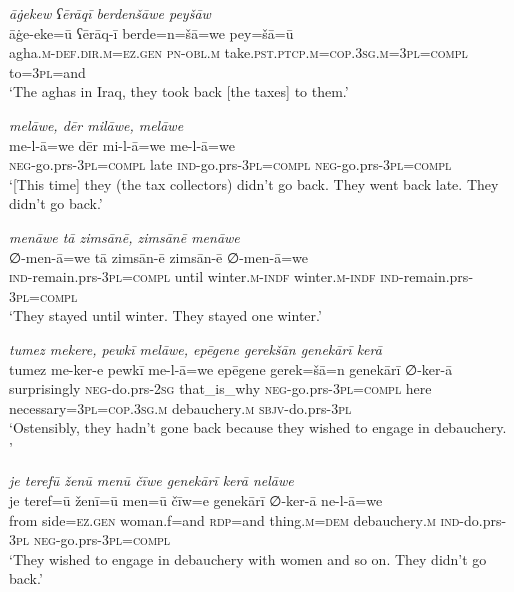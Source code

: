 \ea \label{BP.28}
\textit{āġekew ʕērāqī berdenšāwe peyšāw} \\ 
\gll āġe-eke=ū ʕērāq-ī berde=n=šā=we pey=šā=ū \\ 
 agha\textsc{.m}\textsc{-def}\textsc{.dir}\textsc{.m}\textsc{=ez.gen} \textsc{pn}\textsc{-obl}\textsc{.m} take\textsc{.pst}\textsc{.ptcp}\textsc{.m}\textsc{=cop}\textsc{.3sg}\textsc{.m}\textsc{=3pl}\textsc{=compl} to\textsc{=3pl}=and \\ 
\glt `The aghas in Iraq, they took back [the taxes] to them.'
\z 
 
\ea \label{BP.32}
\textit{melāwe, dēr milāwe, melāwe} \\ 
\gll me-l-ā=we dēr mi-l-ā=we me-l-ā=we \\ 
 \textsc{neg-}go.prs\textsc{-3pl}\textsc{=compl} late \textsc{ind-}go.prs\textsc{-3pl}\textsc{=compl} \textsc{neg-}go.prs\textsc{-3pl}\textsc{=compl} \\ 
\glt `[This time] they (the tax collectors) didn’t go back. They went back late. They didn’t go back.'
\z 
 
\ea \label{BP.33}
\textit{menāwe tā zimsānē, zimsānē menāwe} \\ 
\gll ∅-men-ā=we tā zimsān-ē zimsān-ē ∅-men-ā=we \\ 
 \textsc{ind-}remain.prs\textsc{-3pl}\textsc{=compl} until winter\textsc{.m}\textsc{-indf} winter\textsc{.m}\textsc{-indf} \textsc{ind-}remain.prs\textsc{-3pl}\textsc{=compl} \\ 
\glt `They stayed until winter. They stayed one winter.'
\z 
 
\ea \label{BP.34}
\textit{tumez mekere, pewkī melāwe, epēgene gerekšān genekārī kerā} \\ 
\gll tumez me-ker-e pewkī me-l-ā=we epēgene gerek=šā=n genekārī ∅-ker-ā \\ 
 surprisingly \textsc{neg-}do.prs-\textsc{2sg} that\_is\_why \textsc{neg-}go.prs\textsc{-3pl}\textsc{=compl} here necessary\textsc{=3pl}\textsc{=cop}\textsc{.3sg}\textsc{.m} debauchery\textsc{.m} \textsc{sbjv-}do.prs\textsc{-3pl} \\ 
\glt `Ostensibly, they hadn’t gone back because they wished to engage in debauchery. '
\z 
 
\ea \label{BP.36}
\textit{je terefū ženū menū čīwe genekārī kerā nelāwe} \\ 
\gll je teref=ū ženī=ū men=ū čīw=e genekārī ∅-ker-ā ne-l-ā=we \\ 
 from side\textsc{=ez.gen} woman.f=and \textsc{rdp}=and thing\textsc{.m}\textsc{=dem} debauchery\textsc{.m} \textsc{ind-}do.prs\textsc{-3pl} \textsc{neg-}go.prs\textsc{-3pl}\textsc{=compl} \\ 
\glt `They wished to engage in debauchery with women and so on. They didn’t go back.'
\z 
 
